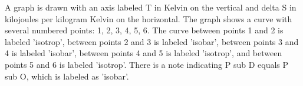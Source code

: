 A graph is drawn with an axis labeled T in Kelvin on the vertical and delta S in kilojoules per kilogram Kelvin on the horizontal. The graph shows a curve with several numbered points: 1, 2, 3, 4, 5, 6. The curve between points 1 and 2 is labeled 'isotrop', between points 2 and 3 is labeled 'isobar', between points 3 and 4 is labeled 'isobar', between points 4 and 5 is labeled 'isotrop', and between points 5 and 6 is labeled 'isotrop'. There is a note indicating P sub D equals P sub O, which is labeled as 'isobar'.